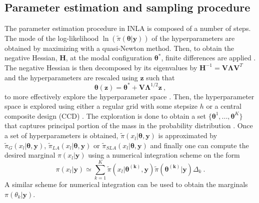 \subsection{Parameter estimation and sampling procedure}
\label{sec:INLA_parameter_estimation}
The parameter estimation procedure in INLA is composed of a number of steps. The mode of the log-likelihood $\ln(\tilde{\pi}(\boldsymbol{\theta} \lvert \mathbf{y}))$ of the hyperparameters are obtained by maximizing with a quasi-Newton method. Then, to obtain the negative Hessian, $\mathbf{H}$, at the modal configuration $\boldsymbol{\theta}^*$, finite differences are applied \citep{gomezrubio2020inla}. The negative Hessian is then decomposed by its eigenvalues by $\mathbf{H}^{-1} = \mathbf{V}\boldsymbol{\Lambda}\mathbf{V}^T$ and the hyperparameters are rescaled using $\mathbf{z}$ such that 
\begin{equation}
    \boldsymbol{\theta}(\mathbf{z}) = \boldsymbol{\theta}^* + \mathbf{V}\boldsymbol{\Lambda}^{1/2}\mathbf{z} \ ,
\end{equation}
to more effectively explore the hyperparameter space \citep{gomezrubio2020inla}. Then, the hyperparameter space is explored using either a regular grid with some stepsize $h$ or a central composite design (CCD) \citep[and references therein]{gomezrubio2020inla}. The exploration is done to obtain a set $\{\boldsymbol{\theta}^1, ..., \boldsymbol{\theta}^K\}$ that captures principal portion of the mass in the probability distribution \citep{martino2019inla}. Once a set of hyperparameters is obtained, $\tilde{\pi}(x_l\lvert\boldsymbol{\theta}, \mathbf{y})$ is approximated by $\tilde{\pi}_G(x_l\lvert\boldsymbol{\theta}, \mathbf{y})$,  $\tilde{\pi}_{LA}(x_l\lvert\boldsymbol{\theta}, \mathbf{y})$ or $\tilde{\pi}_{SLA}(x_l\lvert\boldsymbol{\theta}, \mathbf{y})$ and finally one can compute the desired marginal $\pi(x_l \lvert \mathbf{y})$ using a numerical integration scheme on the form
\begin{equation}
    \label{eq:INLA_marginals_approc}
    \pi(x_l \lvert \mathbf{y}) \simeq \sum_{k=1}^K \tilde{\pi}(x_l \lvert \boldsymbol{\theta^{(k)}}, \mathbf{y}) \tilde{\pi}(\boldsymbol{\theta^{(k)}} \lvert \mathbf{y}) \Delta_k \ .
\end{equation}
A similar scheme for numerical integration can be used to obtain the marginals $\pi(\theta_k \lvert \mathbf{y})$.
